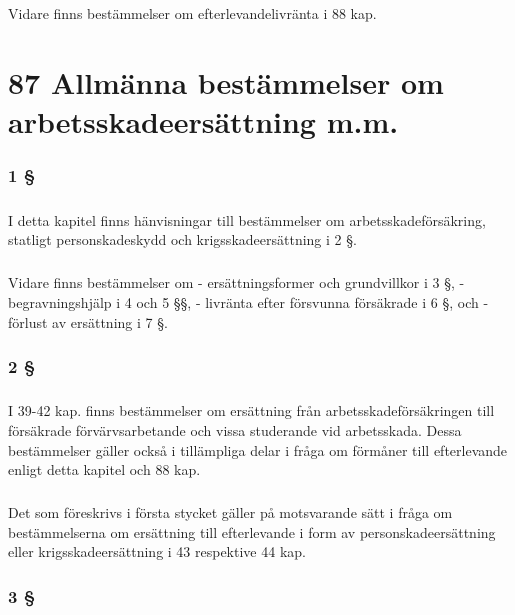 \documentclass[a4paper,notitlepage,openany,10pt]{book}
\begin{document}
\paragraph*{}
Vidare finns bestämmelser om efterlevandelivränta i 88 kap.
\chapter*{87 Allmänna bestämmelser om arbetsskadeersättning m.m.}
\subsection*{1 §}
\paragraph*{}
I detta kapitel finns hänvisningar till bestämmelser om arbetsskadeförsäkring, statligt personskadeskydd och krigsskadeersättning i 2 §.
\paragraph*{}
Vidare finns bestämmelser om
\newline - ersättningsformer och grundvillkor i 3 §,
\newline - begravningshjälp i 4 och 5 §§,
\newline - livränta efter försvunna försäkrade i 6 §, och
\newline - förlust av ersättning i 7 §.
\subsection*{2 §}
\paragraph*{}
I 39-42 kap. finns bestämmelser om ersättning från arbetsskadeförsäkringen till försäkrade förvärvsarbetande och vissa studerande vid arbetsskada. Dessa bestämmelser gäller också i tillämpliga delar i fråga om förmåner till efterlevande enligt detta kapitel och 88 kap.
\paragraph*{}
Det som föreskrivs i första stycket gäller på motsvarande sätt i fråga om bestämmelserna om ersättning till efterlevande i form av personskadeersättning eller krigsskadeersättning i 43 respektive 44 kap.
\subsection*{3 §}
\end{document}
